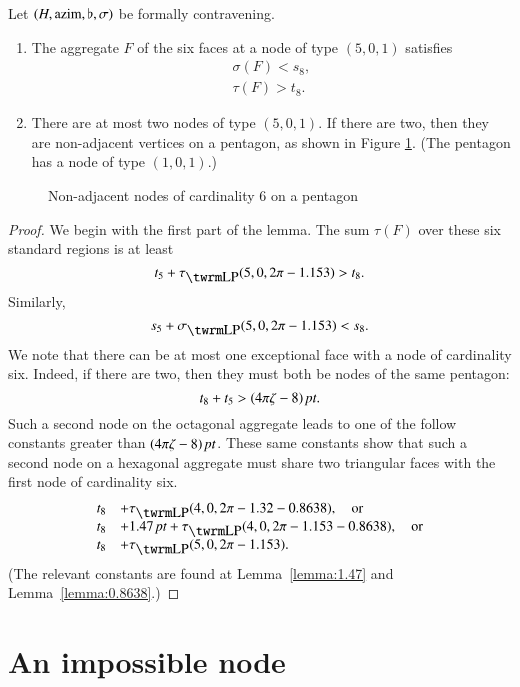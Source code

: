 \begin{lemma}
    \label{lemma:aggregate6}
    Let $(H,{\operatorname{azim}},\flat,\sigma)$ be formally contravening.
    \begin{enumerate}
    \item The aggregate $F$ of the six faces at a node of type
    $(5,0,1)$ satisfies
            $$
            \begin{array}{lll}
            \sigma(F) < s_8,\\
            \tau(F) > t_8.
            \end{array}
            $$
    \item There are at most two nodes of type $(5,0,1)$.  If
        there are two, then they are non-adjacent vertices on a
        pentagon, as shown in Figure \ref{fig:doubledegree6}.  (The
        pentagon has a node of type $(1,0,1)$.)
    \end{enumerate}
\end{lemma}
\begin{figure}[htb]
  \centering
  \caption{Non-adjacent nodes of cardinality $6$ on a pentagon}
  \label{fig:doubledegree6}
\end{figure}

\begin{proof}
We begin with the first part of the lemma. The sum  $\tau(F)$ over
these six standard regions is at least
    $$t_5+\tauLP(5,0,2\pi-1.153)> t_8.$$
Similarly,
    $$s_5+\sLP(5,0,2\pi-1.153)<s_8.$$
%
We note that there can be at most one exceptional face with a node
of cardinality six.  Indeed, if there are two, then they must both
be nodes of the same pentagon:
    $$t_8+t_5>(4\pi\zeta-8)\,\hbox{\it pt}.$$
Such a second node on the octagonal aggregate leads to one of the
follow constants greater than $(4\pi\zeta-8)\,\hbox{\it pt}$.  These same constants
show that such a second node on a hexagonal aggregate must share two
triangular faces with the first node of cardinality six.
$$\begin{array}{lll}
    t_8 &+\tauLP(4,0,2\pi-1.32-0.8638),\quad\text{or}\\
    t_8 &+1.47\,\pt+\tauLP(4,0,2\pi-1.153-0.8638),\quad\text{or}\\
    t_8 &+\tauLP(5,0,2\pi-1.153) .
\end{array}
$$
(The relevant constants are found at Lemma~\ref{lemma:1.47} and
Lemma~\ref{lemma:0.8638}.)
\end{proof}

\section{An impossible node}
\label{sec:impossible}

